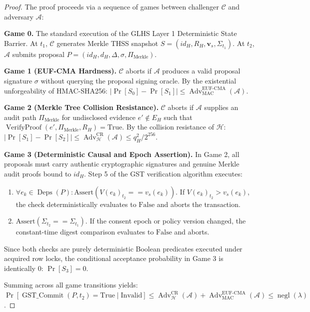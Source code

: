 \begin{proof}
The proof proceeds via a sequence of games between challenger $\mathcal{C}$ and adversary $\mathcal{A}$:

\textbf{Game 0.} The standard execution of the GLHS Layer 1 Deterministic State Barrier. At $t_1$, $\mathcal{C}$ generates Merkle THSS snapshot $S = (id_H, R_H, \mathbf{v}_s, \Sigma_{t_1})$. At $t_2$, $\mathcal{A}$ submits proposal $P = (id_H, d_H, \Delta, \sigma, \Pi_{\text{Merkle}})$.

\textbf{Game 1 (EUF-CMA Hardness).} $\mathcal{C}$ aborts if $\mathcal{A}$ produces a valid proposal signature $\sigma$ without querying the proposal signing oracle. By the existential unforgeability of HMAC-SHA256:
$|\Pr[S_0] - \Pr[S_1]| \le \operatorname{Adv}_{\text{MAC}}^{\text{EUF-CMA}}(\mathcal{A})$.

\textbf{Game 2 (Merkle Tree Collision Resistance).} $\mathcal{C}$ aborts if $\mathcal{A}$ supplies an audit path $\Pi_{\text{Merkle}}$ for undisclosed evidence $e' \notin E_H$ such that $\operatorname{VerifyProof}(e', \Pi_{\text{Merkle}}, R_H) = \text{True}$. By the collision resistance of $\mathcal{H}$:
$|\Pr[S_1] - \Pr[S_2]| \le \operatorname{Adv}_{\mathcal{H}}^{\text{CR}}(\mathcal{A}) \le q_H^2 / 2^{256}$.

\textbf{Game 3 (Deterministic Causal and Epoch Assertion).} In Game 2, all proposals must carry authentic cryptographic signatures and genuine Merkle audit proofs bound to $id_H$. Step 5 of the GST verification algorithm executes:
\begin{enumerate}
    \item $\forall e_k \in \operatorname{Deps}(P): \text{Assert}(V(e_k)_{t_2} == v_s(e_k))$. If $V(e_k)_{t_2} > v_s(e_k)$, the check deterministically evaluates to $\text{False}$ and aborts the transaction.
    \item $\text{Assert}(\Sigma_{t_2} == \Sigma_{t_1})$. If the consent epoch or policy version changed, the constant-time digest comparison evaluates to $\text{False}$ and aborts.
\end{enumerate}
Since both checks are purely deterministic Boolean predicates executed under acquired row locks, the conditional acceptance probability in Game 3 is identically 0: $\Pr[S_3] = 0$.

Summing across all game transitions yields:
$\Pr[\operatorname{GST\_Commit}(P, t_2) = \text{True} \mid \text{Invalid}] \le \operatorname{Adv}_{\mathcal{H}}^{\text{CR}}(\mathcal{A}) + \operatorname{Adv}_{\text{MAC}}^{\text{EUF-CMA}}(\mathcal{A}) \le \operatorname{negl}(\lambda)$.
\end{proof}
